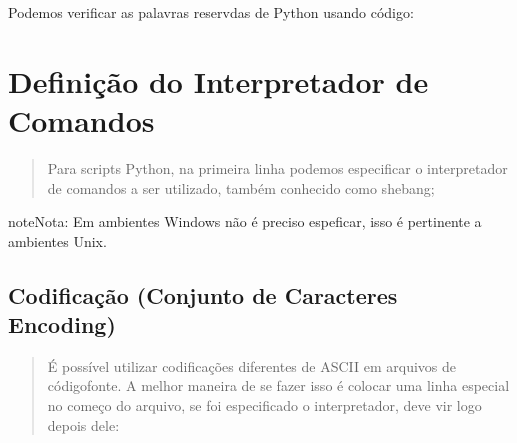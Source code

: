 \documentclass[letterpaper,10pt,brazil]{sphinxmanual}
\begin{document}
Podemos verificar as palavras reservdas de Python usando código:

\begin{sphinxVerbatim}[commandchars=\\\{\}]
     

   
\end{sphinxVerbatim}

\begin{sphinxVerbatim}[commandchars=\\\{\}]
\end{sphinxVerbatim}


\section{Definição do Interpretador de Comandos}
\label{\detokenize{content/language_particularities:definicao-do-interpretador-de-comandos}}\begin{quote}

Para scripts Python, na primeira linha podemos especificar o interpretador de comandos a ser utilizado, também conhecido como shebang;
\end{quote}

\begin{sphinxVerbatim}[commandchars=\\\{\},numbers=left,firstnumber=1,stepnumber=1]
\end{sphinxVerbatim}

\begin{sphinxadmonition}{note}{Nota:}
Em ambientes Windows não é preciso espeficar, isso é pertinente a ambientes Unix.
\end{sphinxadmonition}


\subsection{Codificação (Conjunto de Caracteres \sphinxhyphen{} Encoding)}
\label{\detokenize{content/language_particularities:codificacao-conjunto-de-caracteres-encoding}}\begin{quote}

É possível utilizar codificações diferentes de ASCII em arquivos de código\sphinxhyphen{}fonte.
A melhor maneira de se fazer isso é colocar uma linha especial no começo do arquivo, se foi especificado o interpretador, deve vir logo depois dele:
\end{quote}
\end{document}
